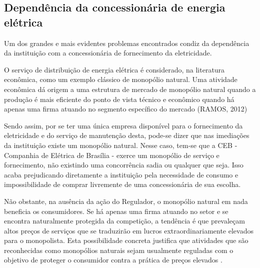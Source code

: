 \subsection{Dependência da concessionária de energia elétrica}
Um dos grandes e mais evidentes problemas encontrados condiz da dependência da instituição com a concessionária de fornecimento da eletricidade.
\par O serviço de distribuição de energia elétrica é considerado, na literatura econômica, como um exemplo clássico de monopólio natural. Uma atividade econômica dá origem a uma estrutura de mercado de monopólio natural quando a produção é mais eficiente do ponto de vista técnico e econômico quando há apenas uma firma atuando no segmento específico do mercado (RAMOS, 2012)
\par Sendo assim, por se ter uma única empresa disponível para o fornecimento da eletricidade e do serviço de manutenção desta, pode-se dizer que nas imediações da instituição existe um monopólio natural. Nesse caso, tem-se que a CEB - Companhia de Elétrica de Brasília - exerce um monopólio de serviço e fornecimento, não existindo uma concorrência sadia ou qualquer que seja. Isso acaba prejudicando diretamente a instituição pela necessidade de consumo e impossibilidade de comprar livremente de uma concessionária de sua escolha.
\par Não obstante, na ausência da ação do Regulador, o monopólio natural em nada beneficia os consumidores. Se há apenas uma firma atuando no setor e se encontra naturalmente protegida da competição, a tendência é que prevaleçam altos preços de serviços que se traduzirão em lucros extraordinariamente elevados para o monopolista. Esta possibilidade concreta justifica que atividades que são reconhecidas como monopólios naturais sejam usualmente reguladas com o objetivo de proteger o consumidor contra a prática de preços elevados \cite{ramos2012porque}.